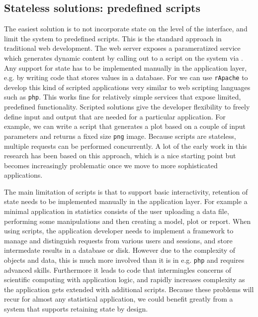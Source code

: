 \subsection{Stateless solutions: predefined scripts}

The easiest solution is to not incorporate state on the level of the interface, and limit the system to predefined scripts. This is the standard approach in traditional web development. The web server exposes a parameratized service which generates dynamic content by calling out to a script on the system via \CGI. Any support for state has to be implemented manually in the application layer, e.g. by writing code that stores values in a database. For \R we can use \texttt{rApache} \citep{horner2013rapache} to develop this kind of scripted applications very similar to web scripting languages such as \texttt{php}. This works fine for relatively simple services that expose limited, predefined functionality. Scripted solutions give the developer flexibility to freely define input and output that are needed for a particular application. For example, we can write a script that generates a plot based on a couple of input parameters and returns a fixed size \texttt{png} image. Because scripts are stateless, multiple requests can be performed concurrently. A lot of the early work in this research has been based on this approach, which is a nice starting point but becomes increasingly problematic once we move to more sophisticated applications.

The main limitation of scripts is that to support basic interactivity, retention of state needs to be implemented manually in the application layer. For example a minimal application in statistics consists of the user uploading a data file, performing some manipulations and then creating a model, plot or report. When using scripts, the application developer needs to implement a framework to manage and distinguish requests from various users and sessions, and store intermedate results in a database or disk. However due to the complexity of objects and data, this is much more involved than it is in e.g. \texttt{php} and requires advanced \R skills. Furthermore it leads to code that intermingles concerns of scientific computing with application logic, and rapidly increases complexity as the application gets extended with additional scripts.
Because these problems will recur for almost any statistical application, we could benefit greatly from a system that supports retaining state by design.

